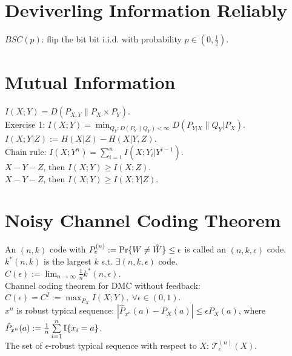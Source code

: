 \section{Deviverling Information Reliably}

$BSC(p)$: flip the bit bit i.i.d. with probability $p\in(0, \frac12)$.

\section{Mutual Information}

$I(X; Y)=D(P_{X, Y}\|P_X\times P_Y)$.\\
Exercise 1: $I(X; Y)=\min_{Q_Y:D(P_Y\|Q_Y)<\infty}D(P_{Y|X}\|Q_Y|P_X)$.\\
$I(X; Y|Z):=H(X|Z)-H(X|Y, Z)$.\\
Chain rule: $I(X; Y^n)=\sum_{i=1}^nI(X; Y_i|Y^{i-1})$.\\
$X-Y-Z$, then $I(X; Y)\geq I(X; Z)$.\\
$X-Y-Z$, then $I(X; Y)\geq I(X; Y|Z)$.

\section{Noisy Channel Coding Theorem}

An $(n, k)$ code with $P_e^{(n)}:=\P\{W\neq\hat W\}\leq\epsilon$ is called an $(n, k, \epsilon)$ code.\\
$k^*(n, k)$ is the largest $k$ s.t. $\exists(n, k, \epsilon)$ code.\\
$C(\epsilon):=\lim_{n\to\infty}\frac1nk^*(n, \epsilon)$.\\
Channel coding theorem for DMC without feedback: $C(\epsilon)=C^I:=\max_{P_X}I(X; Y),\ \forall\epsilon\in(0, 1)$.\\
$x^n$ is robust typical sequence: $|\hat P_{x^n}(a)-P_X(a)|\leq\epsilon P_X(a)$, where $\hat P_{x^n}(a):=\frac1n\suml_{i=1}^n\I\{x_i=a\}$.\\
The set of $\epsilon$-robust typical sequence with respect to $X$: $\mathcal{T}_\epsilon^{(n)}(X)$.

